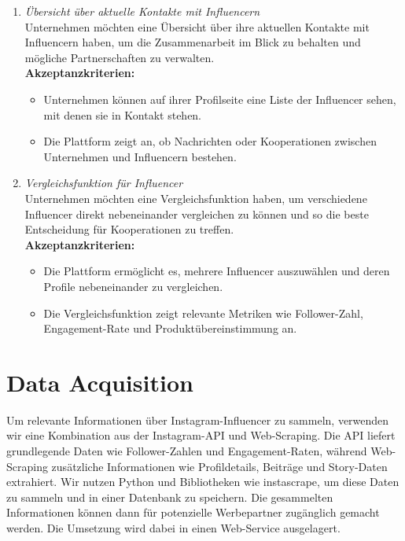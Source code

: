 \documentclass[conference,a4paper,flushend]{cs-techrep}
\begin{document}
\begin{enumerate}
\item{\textit{Übersicht über aktuelle Kontakte mit Influencern}}\\
Unternehmen möchten eine Übersicht über ihre aktuellen Kontakte mit Influencern haben, um die Zusammenarbeit im Blick zu behalten und mögliche Partnerschaften zu verwalten.\\
\textbf{Akzeptanzkriterien:}
\begin{itemize}
\item{Unternehmen können auf ihrer Profilseite eine Liste der Influencer sehen, mit denen sie in Kontakt stehen.}
\item{Die Plattform zeigt an, ob Nachrichten oder Kooperationen zwischen Unternehmen und Influencern bestehen.\\}
\end{itemize}

\item{\textit{Vergleichsfunktion für Influencer}}\\
Unternehmen möchten eine Vergleichsfunktion haben, um verschiedene Influencer direkt nebeneinander vergleichen zu können und so die beste Entscheidung für Kooperationen zu treffen.\\
\textbf{Akzeptanzkriterien:}
\begin{itemize}
\item{Die Plattform ermöglicht es, mehrere Influencer auszuwählen und deren Profile nebeneinander zu vergleichen.}
\item{Die Vergleichsfunktion zeigt relevante Metriken wie Follower-Zahl, Engagement-Rate und Produktübereinstimmung an.\\}
\end{itemize}
\end{enumerate}


\section{Data Acquisition}

Um relevante Informationen über Instagram-Influencer zu sammeln, verwenden wir eine Kombination aus der Instagram-API und Web-Scraping. Die API liefert grundlegende Daten wie Follower-Zahlen und Engagement-Raten, während Web-Scraping zusätzliche Informationen wie Profildetails, Beiträge und Story-Daten extrahiert. Wir nutzen Python und Bibliotheken wie instascrape, um diese Daten zu sammeln und in einer Datenbank zu speichern. Die gesammelten Informationen können dann für potenzielle Werbepartner zugänglich gemacht werden. Die Umsetzung wird dabei in einen Web-Service ausgelagert.
\end{document}
